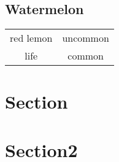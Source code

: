 \documentclass[11pt, a4paper, twoside,parskip=full, openright]{scrreprt}
\begin{document}
	
	
    \section{}
    \subsection{Watermelon}
    \begin{tabular}{c c}
        red lemon & uncommon \\ \n
        life & common
    \end{tabular}
    \section{Section}
    \section{Section2}
\end{document}
